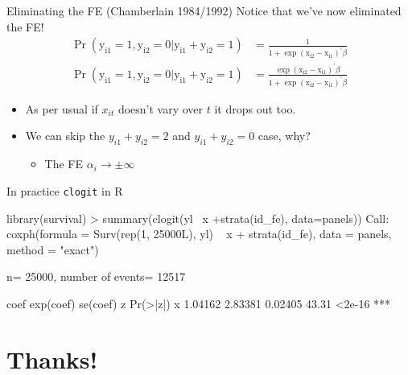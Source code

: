 \documentclass[xcolor=pdftex,dvipsnames,table,mathserif,aspectratio=169]{beamer}
\begin{document}
\begin{frame}{Eliminating the FE (Chamberlain 1984/1992)}
Notice that we've now eliminated the FE!
\begin{align*}
\operatorname{Pr}\left(\mathrm{y}_{\mathrm{i} 1}=1, \mathrm{y}_{\mathrm{i} 2}=0 | \mathrm{y}_{\mathrm{i} 1}+\mathrm{y}_{\mathrm{i} 2}=1\right)&=
\frac{1}{1+\exp \left(\mathrm{x}_{\mathrm{i} 2}-\mathrm{x}_{\mathrm{i} 1}\right)^{\prime} \beta}\\
\operatorname{Pr}\left(\mathrm{y}_{\mathrm{i} 1}=1, \mathrm{y}_{\mathrm{i} 2}=0 | \mathrm{y}_{\mathrm{i} 1}+\mathrm{y}_{\mathrm{i} 2}=1\right)&=
\frac{\exp \left(\mathrm{x}_{\mathrm{i} 2}-\mathrm{x}_{\mathrm{i} 1}\right)^{\prime} \beta}{1+\exp \left(\mathrm{x}_{\mathrm{i} 2}-\mathrm{x}_{\mathrm{i} 1}\right)^{\prime} \beta}
\end{align*}
\begin{itemize}
\item As per usual if $x_{it}$ doesn't vary over $t$ it drops out too.
\item We can skip the $y_{i1} + y_{i2}=2$ and $y_{i1} + y_{i2}=0$ case, why?
\begin{itemize}
\item The FE $\alpha_i \rightarrow \pm \infty$
\end{itemize}
\end{itemize}
\end{frame}


\begin{frame}[fragile]{In practice \texttt{clogit} in R }
\begin{semiverbatim}
library(survival)
> summary(clogit(yl~ x +strata(id_fe), data=panels))
Call:
coxph(formula = Surv(rep(1, 25000L), yl) ~ x + strata(id_fe), 
    data = panels, method = "exact")

  n= 25000, number of events= 12517 

     coef exp(coef) se(coef)     z Pr(>|z|)    
x \alert{1.04162}   2.83381  0.02405 43.31   <2e-16 ***
\end{semiverbatim}
\end{frame}
\section*{Thanks!}
\end{document}
